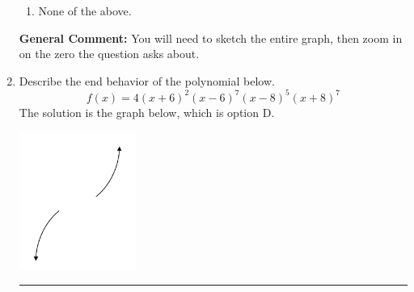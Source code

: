 \documentclass{extbook}[14pt]
\newcommand{\litem}[1]{\item #1

\rule{\textwidth}{0.4pt}}
\begin{document}
\begin{enumerate}
{\begin{enumerate}[label=\Alph*.]
\item None of the above.\end{enumerate}
\textbf{General Comment:} You will need to sketch the entire graph, then zoom in on the zero the question asks about.
}
\litem{
Describe the end behavior of the polynomial below.
\[ f(x) = 4(x + 6)^{2}(x - 6)^{7}(x - 8)^{5}(x + 8)^{7} \]The solution is the graph below, which is option D.
\begin{center}
    \includegraphics[width=0.3\textwidth]{../Figures/polyEndBehaviorCopyDA.png}

\end{center}}
\end{enumerate}
\end{document}
